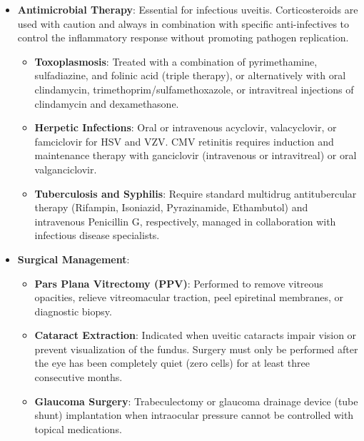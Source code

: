 \begin{itemize}
\begin{itemize}
        \item \textbf{Biologic Response Modifiers}: Monoclonal antibodies targeting Tumor Necrosis Factor-alpha (TNF-alpha), such as Adalimumab and Infliximab, have revolutionized the management of severe, non-infectious uveitis. Adalimumab is the first FDA-approved non-corticosteroid systemic therapy for non-infectious intermediate, posterior, and panuveitis.
    \end{itemize}
    \item \textbf{Antimicrobial Therapy}: Essential for infectious uveitis. Corticosteroids are used with caution and always in combination with specific anti-infectives to control the inflammatory response without promoting pathogen replication.
    \begin{itemize}
        \item \textbf{Toxoplasmosis}: Treated with a combination of pyrimethamine, sulfadiazine, and folinic acid (triple therapy), or alternatively with oral clindamycin, trimethoprim/sulfamethoxazole, or intravitreal injections of clindamycin and dexamethasone.
        \item \textbf{Herpetic Infections}: Oral or intravenous acyclovir, valacyclovir, or famciclovir for HSV and VZV. CMV retinitis requires induction and maintenance therapy with ganciclovir (intravenous or intravitreal) or oral valganciclovir.
        \item \textbf{Tuberculosis and Syphilis}: Require standard multidrug antitubercular therapy (Rifampin, Isoniazid, Pyrazinamide, Ethambutol) and intravenous Penicillin G, respectively, managed in collaboration with infectious disease specialists.
    \end{itemize}
    \item \textbf{Surgical Management}:
    \begin{itemize}
        \item \textbf{Pars Plana Vitrectomy (PPV)}: Performed to remove vitreous opacities, relieve vitreomacular traction, peel epiretinal membranes, or diagnostic biopsy.
        \item \textbf{Cataract Extraction}: Indicated when uveitic cataracts impair vision or prevent visualization of the fundus. Surgery must only be performed after the eye has been completely quiet (zero cells) for at least three consecutive months.
        \item \textbf{Glaucoma Surgery}: Trabeculectomy or glaucoma drainage device (tube shunt) implantation when intraocular pressure cannot be controlled with topical medications.
    \end{itemize}
\end{itemize}

